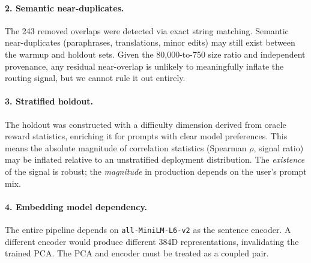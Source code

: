 \paragraph{2. Semantic near-duplicates.}
The 243 removed overlaps were detected via exact string matching.  Semantic
near-duplicates (paraphrases, translations, minor edits) may still exist
between the warmup and holdout sets.  Given the 80,000-to-750 size ratio and
independent provenance, any residual near-overlap is unlikely to meaningfully
inflate the routing signal, but we cannot rule it out entirely.

\paragraph{3. Stratified holdout.}
The holdout was constructed with a difficulty dimension derived from oracle
reward statistics, enriching it for prompts with clear model preferences.
This means the absolute magnitude of correlation statistics (Spearman $\rho$,
signal ratio) may be inflated relative to an unstratified deployment
distribution.  The \emph{existence} of the signal is robust; the
\emph{magnitude} in production depends on the user's prompt mix.

\paragraph{4. Embedding model dependency.}
The entire pipeline depends on \texttt{all-MiniLM-L6-v2} as the sentence
encoder.  A different encoder would produce different 384D representations,
invalidating the trained PCA.  The PCA and encoder must be treated as a
coupled pair.
